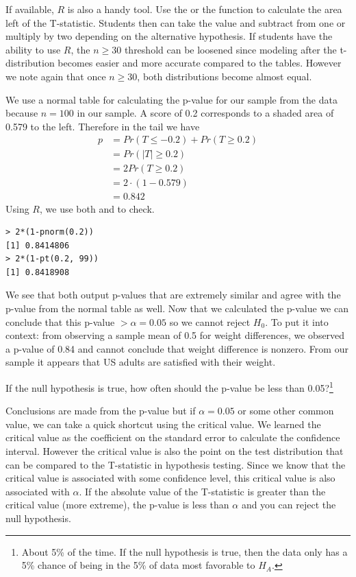 If available, $R$ is also a handy tool. Use the  or the  function to calculate the area left of the T-statistic. Students then can take the value and subtract from one or multiply by two depending on the alternative hypothesis. If students have the ability to use $R$, the $n\geq 30$ threshold can be loosened since modeling after the t-distribution becomes easier and more accurate compared to the tables. However we note again that once $n\geq 30$, both distributions become almost equal. 

We use a normal table for calculating the p-value for our sample from the  data because $n=100$  in our sample. A score of 0.2 corresponds to a shaded area of 0.579 to the left. Therefore in the tail we have 
\begin{align*}
p &=Pr(T\leq -0.2) + Pr(T\geq 0.2)\\
&= Pr(|T| \geq 0.2)\\
&= 2Pr(T\geq 0.2)\\
&= 2 \cdot (1-0.579)\\
&= 0.842
\end{align*}
Using $R$, we use both  and  to check. \begin{verbatim}
> 2*(1-pnorm(0.2))
[1] 0.8414806
> 2*(1-pt(0.2, 99))
[1] 0.8418908
\end{verbatim}

We see that both output p-values that are extremely similar and agree with the p-value from the normal table as well. Now that we calculated the p-value we can conclude that this p-value $> \alpha=0.05$ so we cannot reject $H_0$. To put it into context: from observing a sample mean of 0.5 for weight differences, we observed a p-value of 0.84 and cannot conclude that weight difference is nonzero. From our sample it appears that US adults are satisfied with their weight. 

\begin{exercise}
If the null hypothesis is true, how often should the p-value be less than 0.05?\footnote{About 5\% of the time. If the null hypothesis is true, then the data only has a 5\% chance of being in the 5\% of data most favorable to $H_A$.}
\end{exercise}

\begin{tipBox}{
Conclusions are made from the p-value but if $\alpha=0.05$ or some other common value, we can take a quick shortcut using the critical value. We learned the critical value as the coefficient on the standard error to calculate the confidence interval. However the critical value is also the point on the test distribution that can be compared to the T-statistic in hypothesis testing. Since we know that the critical value is associated with some confidence level, this critical value is also associated with $\alpha$. If the absolute value of the T-statistic is greater than the critical value (more extreme), the p-value is less than $\alpha$ and you can reject the null hypothesis.}
\end{tipBox}


